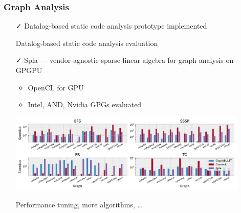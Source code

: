 \documentclass[xcolor=table,aspectratio=169]{beamer}
\begin{document}
\begin{frame}[fragile]
  \frametitle{Graph Analysis}  
  
  \begin{itemize}
    \item[\faCheck] Datalog-based static code analysis prototype implemented
    \item[\faGears] Datalog-based static code analysis evaluation
    \pause 
    \item[\faCheck] Spla --- vendor-agnostic sparse linear algebra for graph analysis on GPGPU
    \begin{itemize}
      \item OpenCL for GPU
      \item Intel, AND, Nvidia GPGs evaluated
    \end{itemize}
    \begin{center}
      \includegraphics[width=0.9\textwidth]{pictures/rq1_rel.pdf}
    \end{center}
     
    \item[\faHourglassHalf] Performance tuning, more algorithms, \ldots
  \end{itemize}
\end{frame}

%  
\end{document}
